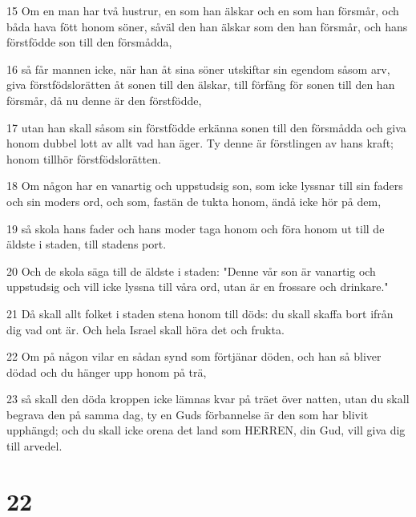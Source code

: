 \par 15 Om en man har två hustrur, en som han älskar och en som han försmår, och båda hava fött honom söner, såväl den han älskar som den han försmår, och hans förstfödde son till den försmådda,
\par 16 så får mannen icke, när han åt sina söner utskiftar sin egendom såsom arv, giva förstfödslorätten åt sonen till den älskar, till förfång för sonen till den han försmår, då nu denne är den förstfödde,
\par 17 utan han skall såsom sin förstfödde erkänna sonen till den försmådda och giva honom dubbel lott av allt vad han äger. Ty denne är förstlingen av hans kraft; honom tillhör förstfödslorätten.
\par 18 Om någon har en vanartig och uppstudsig son, som icke lyssnar till sin faders och sin moders ord, och som, fastän de tukta honom, ändå icke hör på dem,
\par 19 så skola hans fader och hans moder taga honom och föra honom ut till de äldste i staden, till stadens port.
\par 20 Och de skola säga till de äldste i staden: "Denne vår son är vanartig och uppstudsig och vill icke lyssna till våra ord, utan är en frossare och drinkare."
\par 21 Då skall allt folket i staden stena honom till döds: du skall skaffa bort ifrån dig vad ont är. Och hela Israel skall höra det och frukta.
\par 22 Om på någon vilar en sådan synd som förtjänar döden, och han så bliver dödad och du hänger upp honom på trä,
\par 23 så skall den döda kroppen icke lämnas kvar på träet över natten, utan du skall begrava den på samma dag, ty en Guds förbannelse är den som har blivit upphängd; och du skall icke orena det land som HERREN, din Gud, vill giva dig till arvedel.

\chapter{22}

